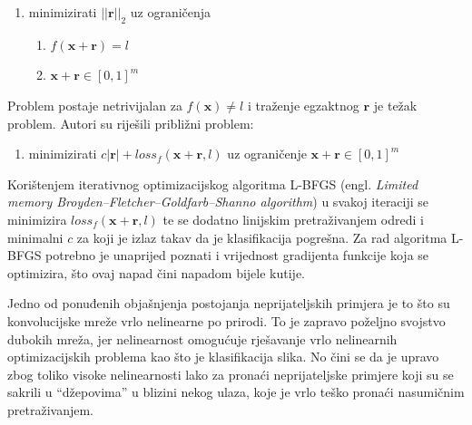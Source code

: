 \documentclass[utf8, diplomski]{fer}
\begin{document}
\begin{enumerate}[noitemsep, label=\textbullet]\label{original_formulation}
  \item minimizirati $||\boldsymbol{r}||_{2}$ uz ograničenja
  \begin{enumerate}
  \item $f(\boldsymbol{x}+\boldsymbol{r}) = l$
  \item $\boldsymbol{x} + \boldsymbol{r} \in [0, 1]^{m}$
  \end{enumerate}
\end{enumerate}
Problem postaje netrivijalan za $f(\boldsymbol{x}) \neq l$ i traženje egzaktnog $\boldsymbol{r}$ je težak problem. Autori su riješili približni problem:
\begin{enumerate}[noitemsep, label=\textbullet]
  \item minimizirati $c|\boldsymbol{r}| + loss_{f}(\boldsymbol{x} + \boldsymbol{r}, l)$ uz ograničenje $\boldsymbol{x} + \boldsymbol{r} \in [0, 1]^{m}$
\end{enumerate}
Korištenjem iterativnog optimizacijskog algoritma L-BFGS (engl. \textit{Limited memory Broyden–Fletcher–Goldfarb–Shanno algorithm}) u svakoj iteraciji se minimizira $loss_{f}(\boldsymbol{x} + \boldsymbol{r}, l)$ te se dodatno linijskim pretraživanjem odredi i minimalni $c$ za koji je izlaz takav da je klasifikacija pogrešna. Za rad algoritma L-BFGS potrebno je unaprijed poznati i vrijednost gradijenta funkcije koja se optimizira, što ovaj napad čini napadom bijele kutije. \par
Jedno od ponuđenih objašnjenja postojanja neprijateljskih primjera je to što su konvolucijske mreže vrlo nelinearne po prirodi. To je zapravo poželjno svojstvo dubokih mreža, jer nelinearnost omogućuje rješavanje vrlo nelinearnih optimizacijskih problema kao što je klasifikacija slika. No čini se da je upravo zbog toliko visoke nelinearnosti lako za pronaći neprijateljske primjere koji su se sakrili u ``džepovima'' u blizini nekog ulaza, koje je vrlo teško pronaći nasumičnim pretraživanjem. 
\end{document}
